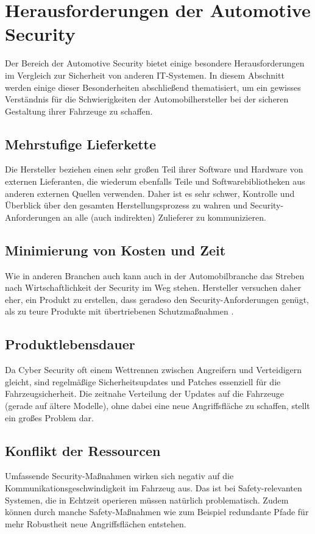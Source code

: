 \section{Herausforderungen der Automotive Security}
Der Bereich der Automotive Security bietet einige besondere Herausforderungen im Vergleich zur Sicherheit von anderen IT-Systemen. In diesem Abschnitt werden einige dieser Besonderheiten abschließend thematisiert, um ein gewisses Verständnis für die Schwierigkeiten der Automobilhersteller bei der sicheren Gestaltung ihrer Fahrzeuge zu schaffen.

\subsection{Mehrstufige Lieferkette}
Die Hersteller beziehen einen sehr großen Teil ihrer Software und Hardware von externen Lieferanten, die wiederum ebenfalls Teile und Softwarebibliotheken aus anderen externen Quellen verwenden. Daher ist es sehr schwer, Kontrolle und Überblick über den gesamten Herstellungsprozess zu wahren und Security-Anforderungen an alle (auch indirekten) Zulieferer zu kommunizieren. \cite[36]{Wurm.2022} 

\subsection{Minimierung von Kosten und Zeit}
Wie in anderen Branchen auch kann auch in der Automobilbranche das Streben nach Wirtschaftlichkeit der Security im Weg stehen. Hersteller versuchen daher eher, ein Produkt zu erstellen, dass geradeso den Security-Anforderungen genügt, als zu teure Produkte mit übertriebenen Schutzmaßnahmen \cite[37]{Wurm.2022}.

\subsection{Produktlebensdauer}
Da Cyber Security oft einem Wettrennen zwischen Angreifern und Verteidigern gleicht, sind regelmäßige Sicherheitsupdates und Patches essenziell für die Fahrzeugsicherheit. Die zeitnahe Verteilung der Updates auf die Fahrzeuge (gerade auf ältere Modelle), ohne dabei eine neue Angriffsfläche zu schaffen, stellt ein großes Problem dar. \cite[37]{Wurm.2022}

\subsection{Konflikt der Ressourcen}
Umfassende Security-Maßnahmen wirken sich negativ auf die Kommunikationsgeschwindigkeit im Fahrzeug aus. Das ist bei Safety-relevanten Systemen, die in Echtzeit operieren müssen natürlich problematisch. Zudem können durch manche Safety-Maßnahmen wie zum Beispiel redundante Pfade für mehr Robustheit neue Angriffsflächen entstehen. \cite[38]{Wurm.2022}

